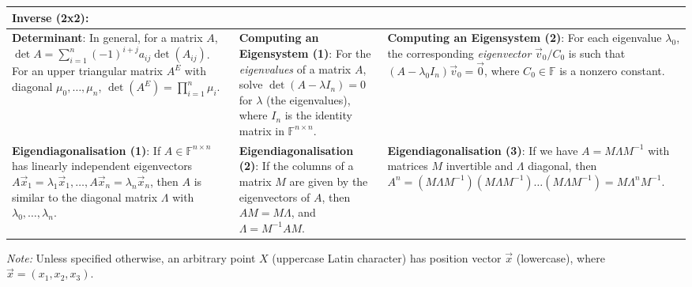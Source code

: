 \begin{tabular}{|m{.31\linewidth}|m{.31\linewidth}|m{.31\linewidth}|}
\textbf{Inverse (2x2)}:
    \smash{$\displaystyle
        A = \begin{pmatrix}
            a & b \\
            c & d
        \end{pmatrix},\,
        A^{-1} = \frac{1}{\det A}
        \begin{pmatrix}
            d & -b \\
            -c & a
        \end{pmatrix}
    $} \\

\hline

\textbf{Determinant}:
    In general, for a matrix $ A $, $ \det A = \sum_{i=1}^n (-1)^{i+j} a_{ij}
    \det(A_{ij}) $. For an upper triangular matrix $ A^E $ with diagonal $
    \mu_0, \ldots, \mu_n $, $ \det\left(A^E\right) = \prod_{i=1}^n \mu_i $. &

\textbf{Computing an Eigensystem (1)}:
    For the \emph{eigenvalues} of a matrix $ A $, solve $ \det(A-\lambda
    I_n) = 0 $ for $ \lambda $ (the eigenvalues), where $ I_n $ is the identity
    matrix in $ \mathbb{F}^{n \times n} $. &

\textbf{Computing an Eigensystem (2)}:
    For each eigenvalue $ \lambda_0 $, the corresponding \emph{eigenvector} $
    \vec{v}_0/C_0 $ is such that $ (A - \lambda_0 I_n) \vec{v}_0 = \vec{0} $,
    where $ C_0 \in \mathbb{F} $ is a nonzero constant. \\

\hline

\textbf{Eigendiagonalisation (1)}:
    If $ A \in \mathbb{F}^{n \times n} $ has linearly independent eigenvectors $
    A\vec{x}_1 = \lambda_1\vec{x}_1, \ldots, A\vec{x}_n = \lambda_n\vec{x}_n $,
    then $ A $ is similar to the diagonal matrix $ \Lambda $ with $ \lambda_0,
    \ldots, \lambda_n $. &

\textbf{Eigendiagonalisation (2)}:
    If the columns of a matrix $ M $ are given by the eigenvectors of $ A $,
    then $ AM = M\Lambda $, and $ \Lambda = M^{-1}AM $. &

\textbf{Eigendiagonalisation (3)}:
    If we have $ A = M \Lambda M^{-1} $ with matrices $ M $ invertible and $
    \Lambda $ diagonal, then $ A^n = (M \Lambda M^{-1})(M \Lambda M^{-1}) \ldots
    (M \Lambda M^{-1}) = M \Lambda^n M^{-1} $. \\

\hline
\end{tabular}

\vfill
\emph{Note:} Unless specified otherwise, an arbitrary point $ X $ (uppercase
Latin character) has position vector $ \vec{x} $ (lowercase), where $ \vec{x} =
(x_1, x_2, x_3) $.
\vfill

